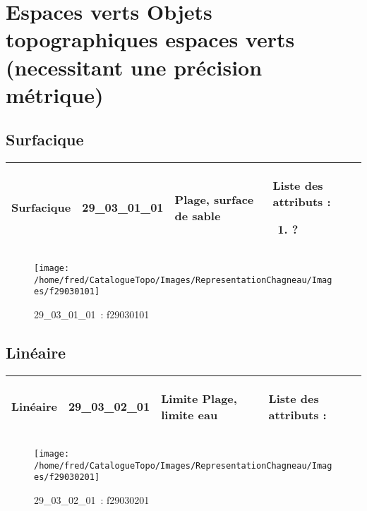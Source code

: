 \documentclass[12pt,titlepage]{book}
\begin{document}
\section{\large Espaces verts Objets topographiques espaces verts (necessitant une précision métrique)}
\subsection{Surfacique}
\noindent
\vspace{\baselineskip}

\renewcommand{\arraystretch}{1.2}
\begin{supertabular}{|p{10cm}|c|p{13cm}|p{12cm}|}
 Surfacique & 29\_03\_01\_01 & Plage, surface de sable & Liste des attributs :
\begin{enumerate}
  \item ?\end{enumerate}
\\
\hline
\end{supertabular}
\begin{figure}[h!]
  \hfill         %
  \begin{minipage}[t]{3cm}
    \begin{center}
      \texttt{[image: /home/fred/CatalogueTopo/Images/RepresentationChagneau/Images/f29030101]}
      \caption[~29\_03\_01\_01]{\small{29\_03\_01\_01~:} \tiny{f29030101}}\label{f29030101}
    \end{center}
  \end{minipage}
\end{figure}


\subsection{Linéaire}
\noindent
\vspace{\baselineskip}

\renewcommand{\arraystretch}{1.2}
\begin{supertabular}{|p{10cm}|c|p{13cm}|p{12cm}|}
 Linéaire & 29\_03\_02\_01 & Limite Plage, limite eau & Liste des attributs :
\begin{enumerate}
\end{enumerate}
\\
\hline
\end{supertabular}
\begin{figure}[h!]
  \hfill         %
  \begin{minipage}[t]{3cm}
    \begin{center}
      \texttt{[image: /home/fred/CatalogueTopo/Images/RepresentationChagneau/Images/f29030201]}
      \caption[~29\_03\_02\_01]{\small{29\_03\_02\_01~:} \tiny{f29030201}}\label{f29030201}
    \end{center}
  \end{minipage}
\end{figure}
\end{document}
